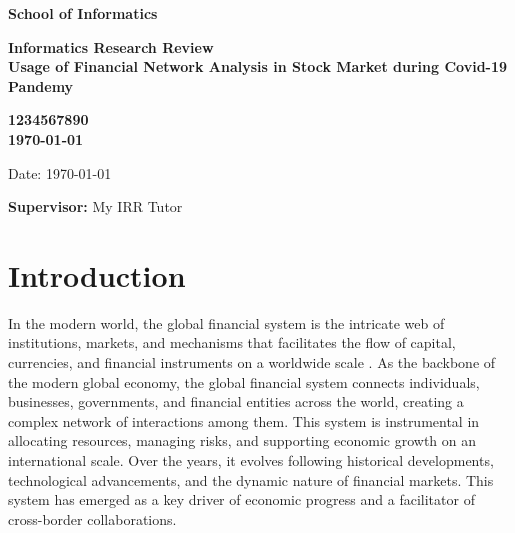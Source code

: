 \documentclass[a4paper,11pt]{article}
\newcommand{\examnumber}{1234567890}
\newcommand{\field}{Usage of Financial Network Analysis in Stock Market during Covid-19 Pandemy}
\newcommand{\supervisor}{My IRR Tutor}
\begin{document}
\begin{minipage}[b]{110mm}
        {\Huge\bf School of Informatics
        \vspace*{17mm}}
\end{minipage}
\hfill
\begin{minipage}[t]{40mm}               
\end{minipage}
\par\noindent
\vspace*{2cm}
\begin{center}
        \Large\bf Informatics Research Review \\
        \Large\bf \field
\end{center}
\vspace*{1.5cm}
\begin{center}
        \bf \examnumber\\
        \monthyeardate\today
\end{center}
\vspace*{5mm}

%
%                       
\begin{abstract}
        
\end{abstract}

\vspace*{1cm}

\vspace*{3cm}
Date: \today

\vfill
{\bf Supervisor:} \supervisor
\newpage

\setcounter{page}{1}                            %
\footruleheight{1pt}
\headruleheight{1pt}
\rhead{- \thepage}
\cfoot{}
%

\section{Introduction}

In the modern world, the global financial system is the intricate web of institutions, markets, and mechanisms that facilitates the flow of capital, currencies, and financial instruments on a worldwide scale \cite{FinancialSystem}. As the backbone of the modern global economy, the global financial system connects individuals, businesses, governments, and financial entities across the world, creating a complex network of interactions among them. This system is instrumental in allocating resources, managing risks, and supporting economic growth on an international scale. Over the years, it evolves following historical developments, technological advancements, and the dynamic nature of financial markets. This system has emerged as a key driver of economic progress and a facilitator of cross-border collaborations.
\end{document}

